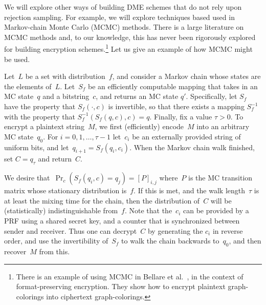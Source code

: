 We will explore other ways of building DME schemes that do not rely upon 
rejection sampling. For example, we will explore techniques based used in
Markov-chain Monte Carlo (MCMC) methods.  There is a large literature
on MCMC methods and, to our knowledge, this has never been rigorously explored
for building encryption schemes.\footnote{There is an example of
using MCMC in Bellare et al.~\cite{BRRS09}, in the context of
format-preserving encryption. They show how to encrypt plaintext graph-colorings
into ciphertext graph-colorings.
}
Let us give an example of how MCMC might be used.

Let~$L$ be a set with distribution~$f$, and consider a Markov
chain whose states are the elements of~$L$.  Let~$S_f$ be an efficiently
computable mapping that takes in an MC state~$q$ and a bitstring~$c$, and
returns an MC state $q'$.  
Specifically, let $S_f$ have the property
that $S_f(\cdot,c)$ is invertible, so that there exists a mapping
$S_f^{-1}$ with the property that $S_f^{-1}(S_f(q,c),c)=q$.  
Finally, fix a value $\tau>0$.
To encrypt a plaintext string~$M$, we first (efficiently) encode~$M$ into an arbitrary MC
state~$q_0$.  For $i=0,1,\ldots,\tau-1$ let~$c_i$ be an 
externally provided string of uniform bits, and let~$q_{i+1} =
S_{f}(q_i,c_i)$.  When the Markov chain walk finished, set $C=q_\tau$
and return~$C$.

We desire that~$\Pr_c(S_f(q_i,c)=q_j)=[P]_{i,j}$ where~$P$ is the MC
transition matrix whose stationary distribution is~$f$.
If this is met, and the walk length~$\tau$
is at least the mixing time for the chain,
then the distribution of~$C$ will be (statistically) indistinguishable
from~$f$.  
Note that 
the~$c_i$ can be provided by a PRF using a shared secret key, and a
counter that is synchronized between sender and receiver.  Thus one
can decrypt~$C$ by generating the $c_i$ in reverse order, and use the
invertibility of~$S_f$ to walk the chain backwards to~$q_0$, and then
recover~$M$ from this. 

